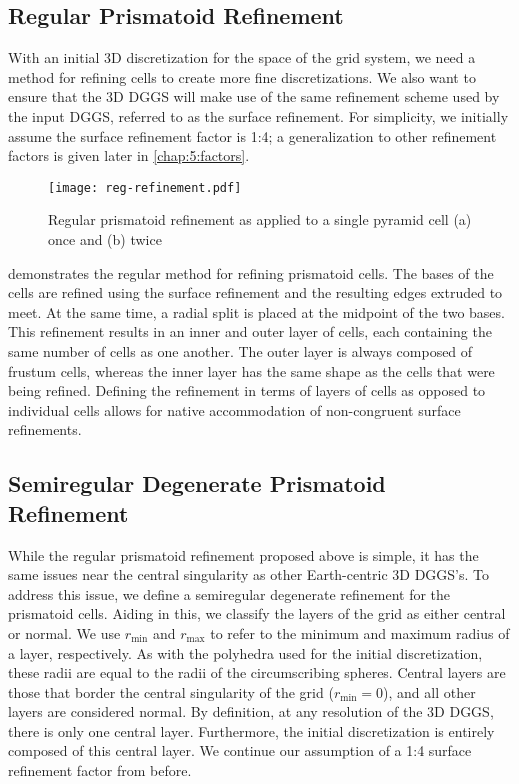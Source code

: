 \subsection{Regular Prismatoid Refinement} \label{chap:5:regular}
With an initial 3D discretization for the space of the grid system, we need a method for refining cells to create more fine discretizations.
We also want to ensure that the 3D DGGS will make use of the same refinement scheme used by the input DGGS, referred to as the surface refinement.
For simplicity, we initially assume the surface refinement factor is 1:4; a generalization to other refinement factors is given later in \cref{chap:5:factors}.


\begin{figure}[ht!]
	\centering
	\texttt{[image: reg-refinement.pdf]}
	\caption[Regular prismatoid refinement]{
		Regular prismatoid refinement as applied to a single pyramid cell (a) once and (b) twice
	}
	\label{fig:regular}
\end{figure}


 demonstrates the regular method for refining prismatoid cells.
The bases of the cells are refined using the surface refinement and the resulting edges extruded to meet.
At the same time, a radial split is placed at the midpoint of the two bases.
This refinement results in an inner and outer layer of cells, each containing the same number of cells as one another.
The outer layer is always composed of frustum cells, whereas the inner layer has the same shape as the cells that were being refined.
Defining the refinement in terms of layers of cells as opposed to individual cells allows for native accommodation of non-congruent surface refinements.


\subsection{Semiregular Degenerate Prismatoid Refinement} \label{chap:5:semireg}
While the regular prismatoid refinement proposed above is simple, it has the same issues near the central singularity as other Earth-centric 3D DGGS's.
To address this issue, we define a semiregular degenerate refinement for the prismatoid cells.
Aiding in this, we classify the layers of the grid as either central or normal.
We use $r_\mathrm{min}$ and $r_\mathrm{max}$ to refer to the minimum and maximum radius of a layer, respectively.
As with the polyhedra used for the initial discretization, these radii are equal to the radii of the circumscribing spheres.
Central layers are those that border the central singularity of the grid ($r_\mathrm{min} = 0$), and all other layers are considered normal.
By definition, at any resolution of the 3D DGGS, there is only one central layer.
Furthermore, the initial discretization is entirely composed of this central layer.
We continue our assumption of a 1:4 surface refinement factor from before.


